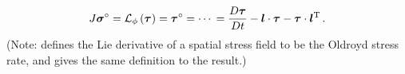 \documentclass[10pt,letterpaper,oneside]{report}
\newcommand{\ten}[1]{\mbox{\boldmath $#1$}{}}
\newcommand{\scas}[1]{\mbox{{\scriptsize{${\rm{#1}}$}}}{}}
\begin{document}
\begin{align}
J \ten{\sigma}^{\circ} = \mathcal{L}_{\phi} \left( \ten{\tau} \right) = \ten{ \tau}^{\circ} 
= \cdots{} 
= \frac{D \ten{\tau}}{D t} - \ten{l} \cdot \ten{\tau} - \ten{\tau} \cdot \ten{l}^{\scas{T}} \, . 
\end{align} 
(Note: \textcite[Sec.~5.3]{Holzapfel} defines the Lie derivative of a spatial stress field to be the Oldroyd stress rate, and gives the same definition to the result.)  
\end{document}
